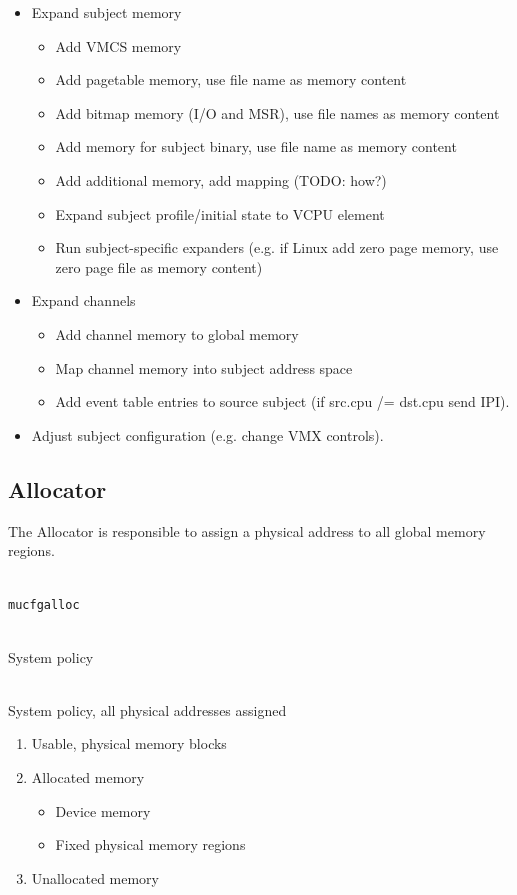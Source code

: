 \documentclass[a4paper,twoside,titlepage]{article}
\begin{document}
\begin{itemize}
	\item Expand subject memory
		\begin{itemize}
			\item Add VMCS memory
			\item Add pagetable memory, use file name as memory content
			\item Add bitmap memory (I/O and MSR), use file names as memory content
			\item Add memory for subject binary, use file name as memory content
			\item Add additional memory, add mapping (TODO: how?)
			\item Expand subject profile/initial state to VCPU element
			\item Run subject-specific expanders (e.g. if Linux add zero page
				memory, use zero page file as memory content)
		\end{itemize}
	\item Expand channels
		\begin{itemize}
			\item Add channel memory to global memory
			\item Map channel memory into subject address space
			\item Add event table entries to source subject
				(if src.cpu /= dst.cpu send IPI).
		\end{itemize}
	\item Adjust subject configuration (e.g. change VMX controls).
\end{itemize}

\subsection{Allocator}
\label{sec:tools-allocator}
The Allocator is responsible to assign a physical address to all global memory
regions.

\begin{description} \itemsep1pt \parskip0pt
	\item[Name] \hfill \\
		\texttt{mucfgalloc}
	\item[Input] \hfill \\
		System policy
	\item[Output] \hfill \\
		System policy, all physical addresses assigned
	\item[Data] \hfill
		\begin{enumerate}
			\item Usable, physical memory blocks
			\item Allocated memory
				\begin{itemize}
					\item Device memory
					\item Fixed physical memory regions
				\end{itemize}
			\item Unallocated memory
		\end{enumerate}
\end{description}
\end{document}
